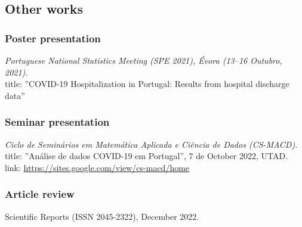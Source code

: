 \documentclass[11pt,oneside,a4paper,titlepage]{article}
\begin{document}
%
\subsection{  Other works}

\subsubsection{Poster presentation}
\textit{Portuguese National Statistics Meeting (SPE 2021), Évora (13–16 Outubro, 2021).}\\
title: ''COVID-19 Hospitalization in Portugal: Results from hospital discharge data''\\

\subsubsection{Seminar presentation}
\textit{Ciclo de Seminários em Matemática Aplicada e Ciência de Dados (CS-MACD).}\\
title: ''Análise de dados COVID-19 em Portugal'', 7 de October 2022, UTAD.\\
link: \href{https://sites.google.com/view/cs-macd/home}{https://sites.google.com/view/cs-macd/home}\\

\subsubsection{Article review}
Scientific Reports (ISSN 2045-2322), December 2022.
\end{document}
